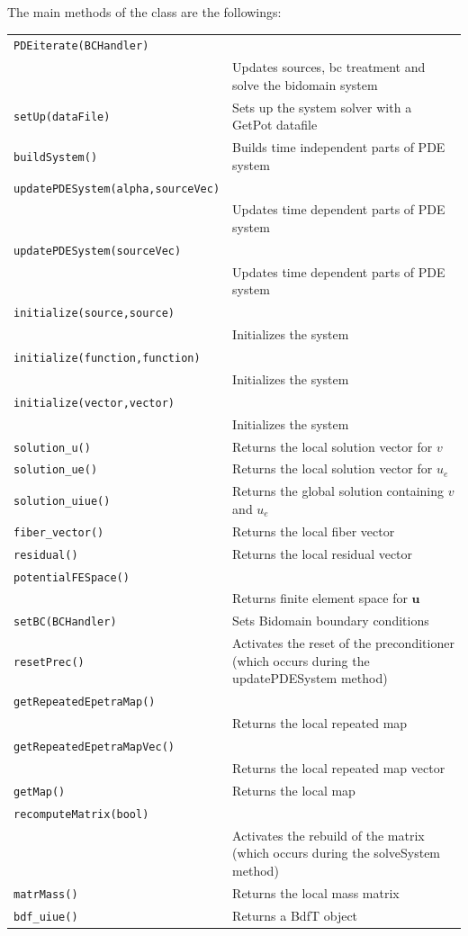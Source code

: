 \documentclass[11pt]{article}
\begin{document}
The main methods of the class are the followings:
\begin{center}
\begin{longtable}{p{3cm}p{8cm}}
	\hline
	\texttt{PDEiterate(BCHandler)} \\
	& Updates sources, bc treatment and solve the bidomain system\\
	\texttt{setUp(dataFile)} & Sets up the system solver with a GetPot datafile\\
	\texttt{buildSystem()} & Builds time independent parts of PDE system\\
	\texttt{updatePDESystem(alpha,sourceVec)} \\
	& Updates time dependent parts of PDE system\\
	\texttt{updatePDESystem(sourceVec)} \\
	& Updates time dependent parts of PDE system\\
	\texttt{initialize(source,source)} \\
	&  Initializes the system\\
	\texttt{initialize(function,function)} \\
	&  Initializes the system\\
	\texttt{initialize(vector,vector)} \\
	&  Initializes the system\\
	\texttt{solution\_u()} & Returns the local solution vector for $v$\\
	\texttt{solution\_ue()} & Returns the local solution vector for $u_e$\\
	\texttt{solution\_uiue()} & Returns the global solution containing $v$ and $u_e$\\
	\texttt{fiber\_vector()} & Returns the local fiber vector\\
	\texttt{residual()} & Returns the local residual vector\\
	\texttt{potentialFESpace()} \\
	& Returns finite element space for $\mathbf{u}$\\
	\texttt{setBC(BCHandler)} & Sets Bidomain boundary conditions\\
	\texttt{resetPrec()} & Activates the reset of the preconditioner (which occurs during the updatePDESystem method)\\
	\texttt{getRepeatedEpetraMap()} \\
	& Returns the local repeated map\\
	\texttt{getRepeatedEpetraMapVec()} \\
	& Returns the local repeated map vector\\
	\texttt{getMap()} & Returns the local map\\
	\texttt{recomputeMatrix(bool)} \\
	& Activates the rebuild of the matrix (which occurs during the solveSystem method)\\
	\texttt{matrMass()} & Returns the local mass matrix\\
	\texttt{bdf\_uiue()} & Returns a BdfT object\\
	\hline
\end{longtable}
\end{center}
\end{document}
